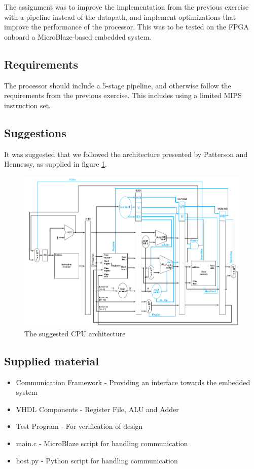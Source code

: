 The assignment was to improve the implementation from the previous exercise with
a pipeline instead of the datapath, and implement optimizations that improve the
performance of the processor. This was to be tested on the FPGA onboard a 
MicroBlaze-based embedded system.

\subsection{Requirements}
The processor should include a 5-stage pipeline, and otherwise follow the
requirements from the previous exercise. This includes using a limited MIPS
instruction set.

\subsection{Suggestions}
It was suggested that we followed the architecture presented by Patterson and
Hennessy, as supplied in figure \ref{fig:suggestedArchitecture}.

\begin{figure}[ht]
    \centering
    \includegraphics[width=\textwidth]{figures/SuggestedArchitecture.png}
    \caption{The suggested CPU architecture} 
    \label{fig:suggestedArchitecture}
\end{figure}


\subsection{Supplied material}
\begin{itemize}
    \item Communication Framework -  Providing an interface towards the embedded system
    \item VHDL Components - Register File, ALU and Adder
    \item Test Program - For verification of design
    \item main.c - MicroBlaze script for handling communication
    \item host.py - Python script for handling communication
\end{itemize}
